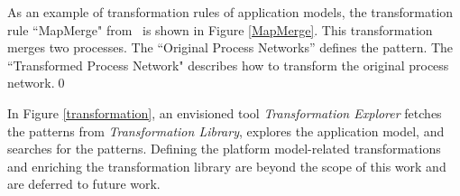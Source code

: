 \begin{exmp}\label{ex:transformationRule}
As an example of transformation rules of application models, the transformation rule ``MapMerge" from~\cite{sander2003system} is shown in Figure \ref{MapMerge}. This transformation merges two processes. The ``Original Process Networks'' defines the pattern. The ``Transformed Process Network" describes how to transform the original process network.\qed
\end{exmp}

In Figure \ref{transformation}, an envisioned tool \textit{Transformation Explorer} fetches the patterns from \textit{Transformation Library}, explores the application model, and searches for the patterns. 
Defining the platform model-related transformations and enriching the transformation library are beyond the scope of this work and are deferred to future work. 

